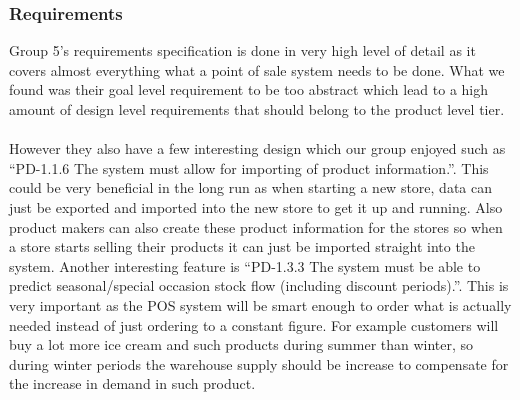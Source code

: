 \documentclass[a4paper]{article}
\begin{document}
\subsubsection{Requirements}
Group 5’s requirements specification is done in very high level of detail as it covers almost everything what a point of sale system needs to be done. What we found was their goal level requirement to be too abstract which lead to a high amount of design level requirements that should belong to the product level tier.
\\\\
However they also have a few interesting design which our group enjoyed such as “PD-1.1.6 The system must allow for importing of product information.”. This could be very beneficial in the long run as when starting a new store, data can just be exported and imported into the new store to get it up and running. Also product makers can also create these product information for the stores so when a store starts selling their products it can just be imported straight into the system. Another interesting feature is “PD-1.3.3 The system must be able to predict seasonal/special occasion stock flow (including discount periods).”. This is very important as the POS system will be smart enough to order what is actually needed instead of just ordering to a constant figure. For example customers will buy a lot more ice cream and such products during summer than winter, so during winter periods the warehouse supply should be increase to compensate for the increase in demand in such product. 
\\\\
\end{document}
